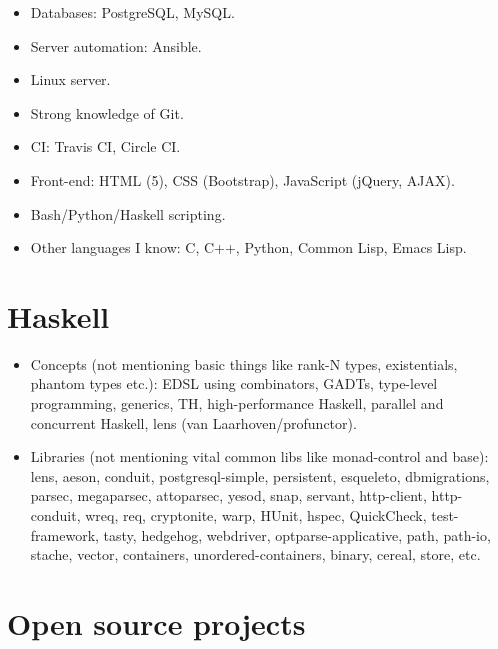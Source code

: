 \documentclass[a4paper,12pt]{article}
\begin{document}
\begin{itemize}[noitemsep]
\item Databases: PostgreSQL, MySQL.
\item Server automation: Ansible.
\item Linux server.
\item Strong knowledge of Git.
\item CI: Travis CI, Circle CI.
\item Front-end: HTML (5), CSS (Bootstrap), JavaScript (jQuery, AJAX).
\item Bash/Python/Haskell scripting.
\item Other languages I know: C, C++, Python, Common Lisp, Emacs Lisp.
\end{itemize}

\section*{Haskell}

\begin{itemize}[noitemsep]
\item Concepts (not mentioning basic things like rank-N types, existentials,
  phantom types etc.): EDSL using combinators, GADTs, type-level
  programming, generics, TH, high-performance Haskell, parallel and
  concurrent Haskell, lens (van Laarhoven/profunctor).
\item Libraries (not mentioning vital common libs like monad-control and
  base): lens, aeson, conduit, postgresql-simple, persistent, esqueleto,
  dbmigrations, parsec, megaparsec, attoparsec, yesod, snap, servant,
  http-client, http-conduit, wreq, req, cryptonite, warp, HUnit, hspec,
  QuickCheck, test-framework, tasty, hedgehog, webdriver,
  optparse-applicative, path, path-io, stache, vector, containers,
  unordered-containers, binary, cereal, store, etc.
\end{itemize}

\pagebreak

\section*{Open source projects}
\end{document}
